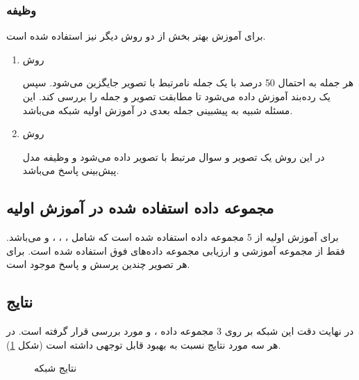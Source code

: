 \subsubsection{وظیفه
	}
برای آموزش بهتر بخش 
از دو روش دیگر نیز استفاده شده است.
\begin{enumerate}
	\item روش 
	
هر جمله به احتمال 50 درصد با یک جمله نامرتبط با تصویر جایگزین می‌شود. سپس یک رده‌بند
آموزش داده می‌شود تا مطابقت تصویر و جمله را بررسی کند. این مسئله شبیه به پیشبینی جمله بعدی 
در آموزش اولیه شبکه 
می‌باشد.

	\item روش 
	
در این روش یک تصویر و سوال مرتبط با تصویر داده می‌شود و وظیفه مدل پیش‌بینی پاسخ می‌باشد.
\end{enumerate}

\subsection{مجموعه داده استفاده شده در آموزش اولیه}
برای آموزش اولیه از 5 مجموعه داده استفاده شده است که شامل 
،
،
،
و
می‌باشد. فقط از مجموعه آموزشی
و ارزیابی
مجموعه داده‌های فوق استفاده شده است. برای هر تصویر چندین پرسش و پاسخ موجود است.

\subsection{نتایج}
	در نهایت  دقت این شبکه بر روی 3 مجموعه داده 
	،
	و
	مورد بررسی قرار گرفته است. در هر سه مورد نتایج نسبت به
	بهبود قابل توجهی داشته است (شکل
	\ref{lxmert-result}).
	\begin{figure}[H]
		\caption{نتایج شبکه 
			\cite{tan2019lxmert}}
		\label{lxmert-result}
	\end{figure}